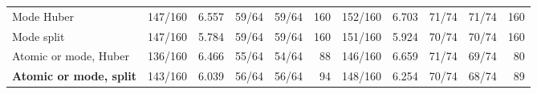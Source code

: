 \begin{table}[t]
\begin{tabular}{@{}lrrrrr@{\hspace{12pt}}rrrrr@{}}
Mode Huber & 147/160 & 6.557 & 59/64 & 59/64 & 160 & 152/160 & 6.703 & 71/74 & 71/74 & 160\\
Mode split & 147/160 & 5.784 & 59/64 & 59/64 & 160 & 151/160 & 5.924 & 70/74 & 70/74 & 160\\
Atomic or mode, Huber & 136/160 & 6.466 & 55/64 & 54/64 & 88 & 146/160 & 6.659 & 71/74 & 69/74 & 80\\
\textbf{Atomic or mode, split} & 143/160 & 6.039 & 56/64 & 56/64 & 94 & 148/160 & 6.254 & 70/74 & 68/74 & 89\\
\bottomrule
\end{tabular}
\end{table}
